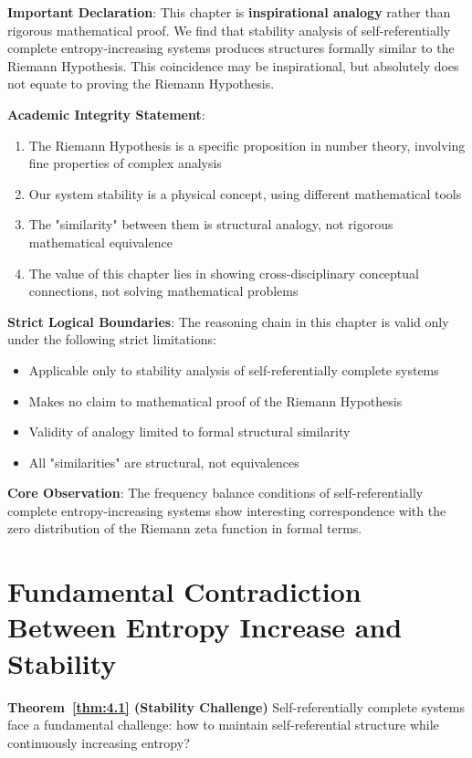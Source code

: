 
\textbf{Important Declaration}: This chapter is \textbf{inspirational analogy} rather than rigorous mathematical proof. We find that stability analysis of self-referentially complete entropy-increasing systems produces structures formally similar to the Riemann Hypothesis. This coincidence may be inspirational, but absolutely does not equate to proving the Riemann Hypothesis.

\textbf{Academic Integrity Statement}:
\begin{enumerate}
\item The Riemann Hypothesis is a specific proposition in number theory, involving fine properties of complex analysis
\item Our system stability is a physical concept, using different mathematical tools
\item The "similarity" between them is structural analogy, not rigorous mathematical equivalence
\item The value of this chapter lies in showing cross-disciplinary conceptual connections, not solving mathematical problems
\end{enumerate}

\textbf{Strict Logical Boundaries}:
The reasoning chain in this chapter is valid only under the following strict limitations:
\begin{itemize}
\item Applicable only to stability analysis of self-referentially complete systems
\item Makes no claim to mathematical proof of the Riemann Hypothesis
\item Validity of analogy limited to formal structural similarity
\item All "similarities" are structural, not equivalences
\end{itemize}

\textbf{Core Observation}: The frequency balance conditions of self-referentially complete entropy-increasing systems show interesting correspondence with the zero distribution of the Riemann zeta function in formal terms.

\section{Fundamental Contradiction Between Entropy Increase and Stability}
\label{sec:ch06_riemann:fundamental-contradiction-between-entropy-increase-and-stability}

\textbf{Theorem~\ref{thm:4.1} (Stability Challenge)}
\label{thm:4.1}
Self-referentially complete systems face a fundamental challenge: how to maintain self-referential structure while continuously increasing entropy?


